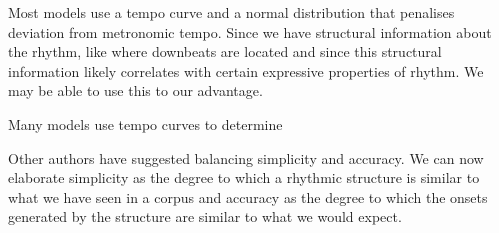 \documentclass[a4paper,10pt]{article}
\begin{document}
Most models use a tempo curve and a normal distribution that penalises deviation from metronomic tempo. Since we have structural information about the rhythm, like where downbeats are located and since this structural information likely correlates with certain expressive properties of rhythm. We may be able to use this to our advantage. 

Many models use tempo curves to determine

Other authors have suggested balancing simplicity and accuracy. We can now elaborate simplicity as the degree to which a rhythmic structure is similar to what we have seen in a corpus and accuracy as the degree to which the onsets generated by the structure are similar to what we would expect.









\end{document}

